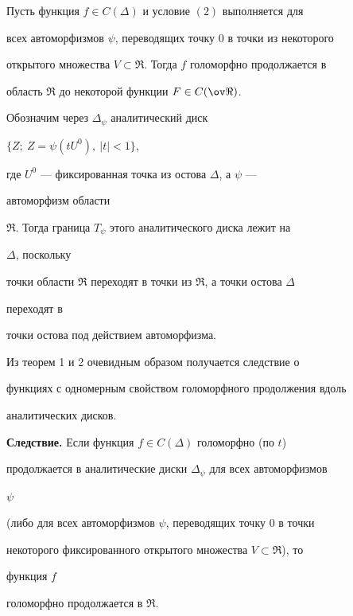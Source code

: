  


\begin{thm} 


Пусть функция $f\in C(\Delta)$ и условие $(2)$ выполняется для 


всех автоморфизмов $\psi$, переводящих точку $0$ в точки из некоторого 


открытого множества $V\subset\Re$. Тогда $f$ голоморфно продолжается в 


область $\Re$ до некоторой функции $F\in C(\ov\Re)$. 


\end{thm} 


 


Обозначим через $\Delta_\psi$ аналитический диск 


$\{Z;\ Z=\psi(t U^0),\ |t|<1\}$, 


где $U^0$ --- фиксированная точка из остова $\Delta$, а $\psi$ --- 


автоморфизм области 


$\Re$. Тогда граница $T_\psi$ этого аналитического диска лежит на 


$\Delta$, поскольку 


точки области $\Re$ переходят в точки из $\Re$, а точки остова $\Delta$ 


переходят в 


точки остова под действием автоморфизма. 


 


Из теорем 1 и 2 очевидным образом получается следствие о 


функциях с одномерным свойством голоморфного продолжения вдоль 


аналитических дисков. 


\medskip 


 


{\bf Следствие.} Если функция $f\in C(\Delta)$ голоморфно (по $t$) 


продолжается в аналитические диски $\Delta_\psi$ для всех автоморфизмов 


$\psi$ 


(либо для всех автоморфизмов $\psi$, переводящих точку 0 в точки 


некоторого фиксированного открытого множества $V\subset\Re$), то 


функция $f$ 


голоморфно продолжается в $\Re$. 


